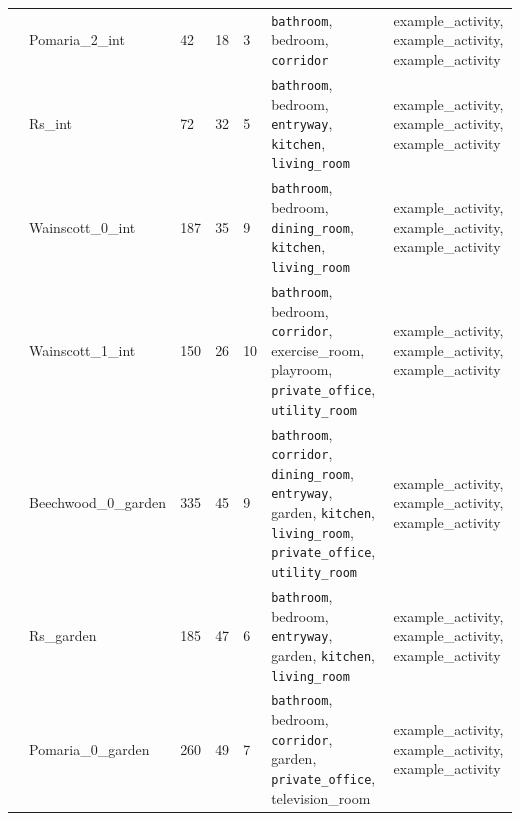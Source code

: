{\begin{table}[H]
{\begin{tabular}{|m{0.8cm}|m{4cm}|m{0.6cm}|m{0.6cm}|m{0.6cm}|m{5cm}|m{5cm}|}
& Pomaria\_2\_int                       & 42           & 18           & 3          & \texttt{bathroom}, bedroom, \texttt{corridor}                                                                                                                      & example\_activity, example\_activity, example\_activity      \\ \cline{2-7} 
& Rs\_int                               & 72           & 32           & 5          & \texttt{bathroom}, bedroom, \texttt{entryway}, \texttt{kitchen}, \texttt{living\_room}                                                                                               & example\_activity, example\_activity, example\_activity      \\ \cline{2-7} 
& Wainscott\_0\_int                     & 187          & 35           & 9          & \texttt{bathroom}, bedroom, \texttt{dining\_room}, \texttt{kitchen}, \texttt{living\_room}                                                                                           & example\_activity, example\_activity, example\_activity      \\ \cline{2-7} 
& Wainscott\_1\_int                     & 150          & 26           & 10         & \texttt{bathroom}, bedroom, \texttt{corridor}, exercise\_room, playroom, \texttt{private\_office}, \texttt{utility\_room}                                                            & example\_activity, example\_activity, example\_activity      \\ \hline
\multirow{5}{*}{\rotatebox[origin=c]{90}{\parbox{4cm}{\textbf{BEHAVIOR-100 Houses w/ New Gardens}}}}
& Beechwood\_0\_garden                  & 335          & 45           & 9          & \texttt{bathroom}, \texttt{corridor}, \texttt{dining\_room}, \texttt{entryway}, garden, \texttt{kitchen}, \texttt{living\_room}, \texttt{private\_office}, \texttt{utility\_room}                                        & example\_activity, example\_activity, example\_activity      \\ \cline{2-7} 
& Rs\_garden                            & 185          & 47           & 6          & \texttt{bathroom}, bedroom, \texttt{entryway}, garden, \texttt{kitchen}, \texttt{living\_room}                                                                                       & example\_activity, example\_activity, example\_activity      \\ \cline{2-7} 
& Pomaria\_0\_garden                    & 260          & 49           & 7          & \texttt{bathroom}, bedroom, \texttt{corridor}, garden, \texttt{private\_office}, television\_room                                                                           & example\_activity, example\_activity, example\_activity      \\ \cline{2-7} 

\end{tabular}}
\end{table}}
